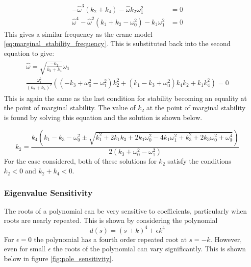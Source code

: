 \documentclass{article}
\begin{document}
\begin{align}
  - \hat{\omega}^{3} \left(k_{2} + k_{4}\right) - \hat{\omega} k_{2} \omega_{1}^{2} &= 0\\
  \hat{\omega}^{4} - \hat{\omega}^{2} \left(k_{1} + k_{3} - \omega_{0}^{2}\right) - k_{1} \omega_{1}^{2} &= 0
\end{align}
This gives a similar frequency as the crane model \ref{eq:marginal_stability_frequency}. This is substituted back into the second equation to give:
\begin{align}
  \begin{gathered}
  \hat{\omega} = \sqrt{\frac{-k_2}{k_2 + k_4}} \omega_1 \\
  \frac{\omega_1^2}{(k_2 + k_4)^2} \left( \left(- k_{3} + \omega_{0}^{2} - \omega_{1}^{2}\right) k_{2}^{2} + \left(k_{1} - k_{3} + \omega_{0}^{2}\right) k_{4} k_{2} + k_{1} k_{4}^{2} \right) = 0
  \end{gathered}
\end{align}
This is again the same as the last condition for stability becoming an equality at the point of marginal stability.
The value of $k_2$ at the point of marginal stability is found by solving this equation and the solution is shown below.

\begin{equation}
  k_{2} = \frac{k_{4} \left(k_{1} - k_{3} - \omega_{0}^{2} \pm \sqrt{k_{1}^{2} + 2 k_{1} k_{3} + 2 k_{1} \omega_{0}^{2} - 4 k_{1} \omega_{1}^{2} + k_{3}^{2} + 2 k_{3} \omega_{0}^{2} + \omega_{0}^{4}}\right)}{2 \left(k_{3} + \omega_{0}^{2} - \omega_{1}^{2}\right)}
  \label{eq:predicted_pendulum_k2}
\end{equation}
For the case considered, both of these solutions for $k_2$ satisfy the conditions $k_2 < 0$ and $k_2 + k_4< 0$.


\subsubsection{Eigenvalue Sensitivity}

The roots of a polynomial can be very sensitive to coefficients, particularly when roots are nearly repeated.
This is shown by considering the polynomial
\begin{equation}
  d(s) = (s+k)^4 + \epsilon k^4
\end{equation}
For $\epsilon = 0$ the polynomial has a fourth order repeated root at $s = -k$.
However, even for small $\epsilon$ the roots of the polynomial can vary significantly. This is shown below in figure \ref{fig:pole_sensitivity}.
\end{document}
